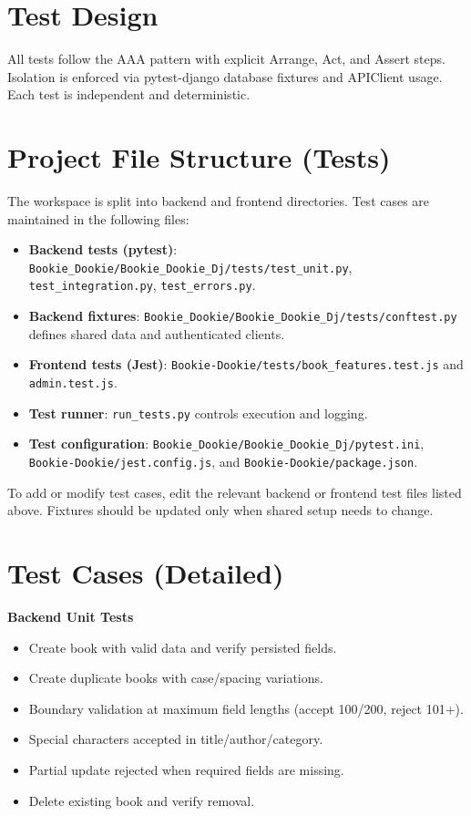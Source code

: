 \documentclass[11pt]{article}
\begin{document}
\section{Test Design}
All tests follow the AAA pattern with explicit Arrange, Act, and Assert steps. Isolation is enforced via pytest-django database fixtures and APIClient usage. Each test is independent and deterministic.

\section{Project File Structure (Tests)}
The workspace is split into backend and frontend directories. Test cases are maintained in the following files:
\begin{itemize}
    \item \textbf{Backend tests (pytest)}: \texttt{Bookie\_Dookie/Bookie\_Dookie\_Dj/tests/test\_unit.py}, \texttt{test\_integration.py}, \texttt{test\_errors.py}.
    \item \textbf{Backend fixtures}: \texttt{Bookie\_Dookie/Bookie\_Dookie\_Dj/tests/conftest.py} defines shared data and authenticated clients.
    \item \textbf{Frontend tests (Jest)}: \texttt{Bookie-Dookie/tests/book\_features.test.js} and \texttt{admin.test.js}.
    \item \textbf{Test runner}: \texttt{run\_tests.py} controls execution and logging.
    \item \textbf{Test configuration}: \texttt{Bookie\_Dookie/Bookie\_Dookie\_Dj/pytest.ini}, \texttt{Bookie-Dookie/jest.config.js}, and \texttt{Bookie-Dookie/package.json}.
\end{itemize}
To add or modify test cases, edit the relevant backend or frontend test files listed above. Fixtures should be updated only when shared setup needs to change.

\section{Test Cases (Detailed)}
\textbf{Backend Unit Tests}
\begin{itemize}
    \item Create book with valid data and verify persisted fields.
    \item Create duplicate books with case/spacing variations.
    \item Boundary validation at maximum field lengths (accept 100/200, reject 101+).
    \item Special characters accepted in title/author/category.
    \item Partial update rejected when required fields are missing.
    \item Delete existing book and verify removal.
\end{itemize}
\end{document}
